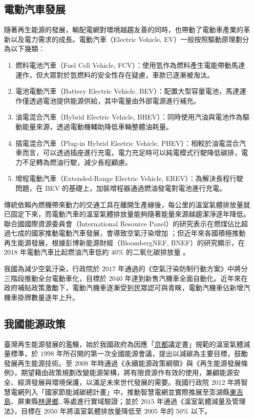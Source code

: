 \subsection{電動汽車發展}

隨著再生能源的發展，輸配電網對環境越趨友善的同時，也帶動了電動車產業的革新以及電力需求的成長。電動汽車（Electric Vehicle, EV）一般按照驅動原理劃分為以下幾類：

\begin{enumerate}
  \item 燃料電池汽車（Fuel Cell Vehicle, FCV）：使用氫作為燃料產生電能帶動馬達運作，但大眾對於氫燃料的安全性存在疑慮，車款已逐漸被淘汰。
  \item 電池電動汽車（Battery Electric Vehicle, BEV）：配置大型容量電池，馬達運作僅透過電池提供能源供給，其中電量由外部電源進行補充。
  \item 油電混合汽車（Hybrid Electric Vehicle, BHEV）：同時使用汽油與電池作為驅動能量來源，透過電動機輔助降低車輛整體油耗量。
  \item 插電混合汽車（Plug-in Hybrid Electric Vehicle, PHEV）：相較於油電混合汽車而言，可以透過插座進行充電，電力充足時可以純電模式行駛降低碳排，電力不足轉為燃油行駛，減少長程顧慮。
  \item 增程電動汽車（Extended-Range Electric Vehicle, EREV）：為解決長程行駛問題，在 BEV 的基礎上，加裝增程器通過燃油發電對電池進行充電。
\end{enumerate}

傳統依賴內燃機帶來動力的交通工具在離開生產線後，每公里的溫室氣體排放量就已固定下來，而電動汽車的溫室氣體排放量能夠隨著能量來源越趨潔淨逐年降低。聯合國國際資源委員會（International Resource Panel）的研究表示在燃煤佔比超過七成的國家推動電動汽車發展，會導致空氣汙染增加 \cite{hertwich2016green}；但近年來各國積極推動再生能源發展，根據彭博新能源財經（BloombergNEF, BNEF）的研究顯示，在 $2018$ 年電動汽車比起燃油汽車低約 $40\%$ 的二氧化碳排放量 \cite{bloomberg2019electric}。

我國為減少空氣汙染，行政院於 $2017$ 年通過的《空氣汙染防制行動方案》中將分三階段推動全台電動車化，目標於 $2040$ 年達到新售汽機車全面自動化。近年來在政府補貼政策激勵下，電動汽機車逐漸受到民眾認可與青睞，電動汽機車佔新增汽機車掛牌數量逐年上升。

\subsection{我國能源政策}

臺灣再生能源發展的濫觴，始於我國政府為因應「\uline{京都}議定書」規範的溫室氣體減量標準，於 $1998$ 年所召開的第一次全國能源會議，提出以減碳為主要目標，鼓勵發展再生能源技術。至 $2008$ 年時通過《永續能源政策綱領》與《再生能源發展條例》，期望藉由政策規劃改變能源架構，將有限資源作有效的使用，兼顧能源安全、經濟發展與環境保護，以滿足未來世代發展的需要。我國行政院 $2012$ 年將智慧電網列入「國家節能減碳總計畫」中，推動智慧電網並實際推展至澎湖縣\uline{東吉島}、屏東縣\uline{林邊鄉}…等處進行實域驗證；並於 $2015$ 年通過《溫室氣體減量及管理法》，目標在 $2050$ 年將溫室氣體排放量降低至 $2005$ 年的 $50\%$ 以下。

